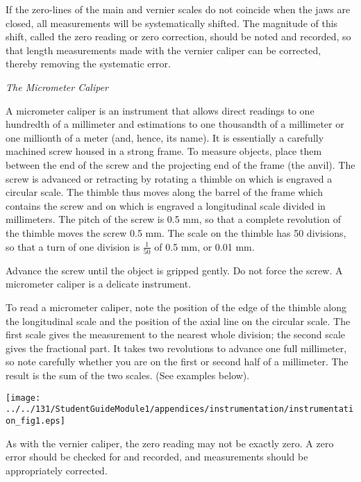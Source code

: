 If the zero-lines of the main and vernier scales do not coincide when the jaws are closed, all measurements will be systematically shifted. The magnitude of this shift, called the zero reading or zero correction, should be noted and recorded, so that length measurements made with the vernier caliper can be corrected, thereby removing the systematic error.

\textit{The Micrometer Caliper}

A micrometer caliper is an instrument that allows direct readings to one hundredth of a millimeter and estimations to one thousandth of a millimeter or one millionth of a meter (and, hence, its name). It is essentially a carefully machined screw housed in a strong frame. To measure objects, place them between the end of the screw and the projecting end of the frame (the anvil). The screw is advanced or retracting by rotating a thimble on which is engraved a circular scale. The thimble thus moves along the barrel of the frame which contains the screw and on which is engraved a longitudinal scale divided in millimeters. The pitch of the screw is 0.5 mm, so that a complete revolution of the thimble moves the screw 0.5 mm. The scale on the thimble has 50 divisions, so that a turn of one division is $\frac{1}{50}$ of 0.5 mm, or 0.01 mm.

Advance the screw until the object is gripped gently. Do not force the screw. A micrometer caliper is a delicate instrument.

To read a micrometer caliper, note the position of the edge of the thimble along the longitudinal scale and the position of the axial line on the circular scale. The first scale gives the measurement to the nearest whole division; the second scale gives the fractional part. It takes two revolutions to advance one full millimeter, so note carefully whether you are on the first or second half of a millimeter. The result is the sum of the two scales. (See examples below).

\vspace{0.3cm}
{\par\centering \texttt{[image: ../../131/StudentGuideModule1/appendices/instrumentation/instrumentation\_fig1.eps]} \par}
\vspace{0.3cm}

As with the vernier caliper, the zero reading may not be exactly zero. A zero error should be checked for and recorded, and measurements should be appropriately corrected.

